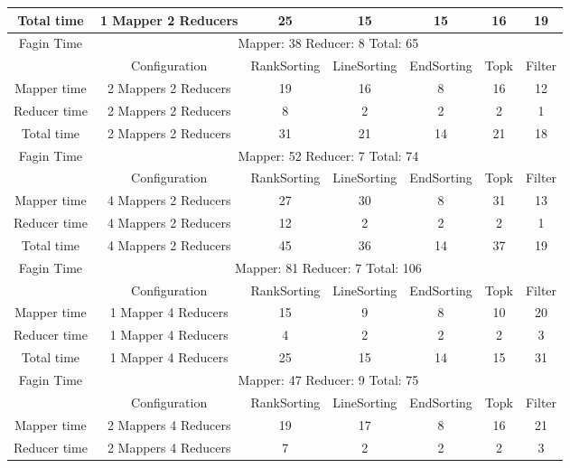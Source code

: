 \documentclass[a4paper]{article}
\begin{document}
\begin{table}[htbp]
\begin{center}
\begin{tabular}{|c|c|c|c|c|c|c|}
            Total time & 1 Mapper 2 Reducers & 25 & 15 & 15 & 16 & 19 \\
            \hline
            Fagin Time & \multicolumn{6}{|c|}{Mapper: 38 Reducer: 8 Total: 65}  \\
            \hline
            \hline
             & Configuration & RankSorting & LineSorting & EndSorting & Topk & Filter  \\
            \hline
            Mapper time & 2 Mappers 2 Reducers & 19 & 16 & 8 & 16 & 12  \\
            Reducer time & 2 Mappers 2 Reducers & 8 & 2 & 2 & 2 & 1   \\
            Total time & 2 Mappers 2 Reducers & 31 & 21 & 14 & 21 & 18 \\
            \hline
            Fagin Time & \multicolumn{6}{|c|}{Mapper: 52 Reducer: 7 Total: 74}  \\
            \hline
            \hline
             & Configuration & RankSorting & LineSorting & EndSorting & Topk & Filter  \\
            \hline
            Mapper time & 4 Mappers 2 Reducers & 27 & 30 & 8 & 31 & 13  \\
            Reducer time & 4 Mappers 2 Reducers & 12 & 2 & 2 & 2 & 1   \\
            Total time & 4 Mappers 2 Reducers & 45 & 36 & 14 & 37 & 19 \\
            \hline
            Fagin Time & \multicolumn{6}{|c|}{Mapper: 81    Reducer: 7  Total: 106}  \\
            \hline
            \hline
             & Configuration & RankSorting & LineSorting & EndSorting & Topk & Filter  \\
            \hline
            Mapper time & 1 Mapper 4 Reducers & 15 & 9 & 8 & 10 & 20  \\
            Reducer time & 1 Mapper 4 Reducers & 4 & 2 & 2 & 2 & 3  \\
            Total time & 1 Mapper 4 Reducers & 25 & 15 & 14 & 15 & 31 \\
            \hline
            Fagin Time & \multicolumn{6}{|c|}{Mapper: 47 Reducer: 9 Total: 75}  \\
            \hline
            \hline
             & Configuration & RankSorting & LineSorting & EndSorting & Topk & Filter  \\
            \hline
            Mapper time & 2 Mappers 4 Reducers & 19 & 17 & 8 & 16 & 21  \\
            Reducer time & 2 Mappers 4 Reducers & 7 & 2 & 2 & 2 & 3  \\

\end{tabular}
\end{center}
\end{table}
\end{document}
